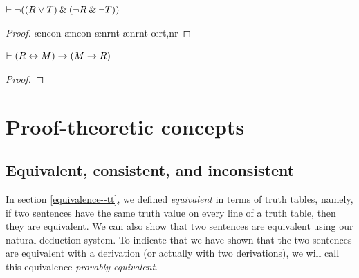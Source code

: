 {{{{{{{{{\begin{small}
\begin{earg}
\noindent\begin{minipage}{0.99\textwidth}
\item $\vdash {\neg}((R \vee T) \mathbin{\&} ({\neg} R  \mathbin{\&} {\neg} T))$
\begin{proof}
\open
         \as{}
         \ae{ncon}
         \ae{ncon}
         \ae{nrnt}
         \ae{nrnt}
         \oe{rt,nr}
\close
{} 
\end{proof}
\medskip
\end{minipage}

\noindent\begin{minipage}{0.99\textwidth}
\item $\vdash (R \leftrightarrow M) \rightarrow (M \rightarrow R)$
\begin{proof}
\open
         \as{}
        	\open
        	 \as{}
        	 
        \close
         
\close
{} 
\end{proof}
\medskip
\end{minipage}

\end{earg}
\end{small}




\chapter{Proof-theoretic concepts}\label{s:ProofTheoreticConcepts}


\section{Equivalent, consistent, and inconsistent}

In section \ref{equivalence--tt}, we defined \textit{equivalent} in terms of truth tables, namely, if two sentences have the same truth value on every line of a truth table, then they are equivalent. We can also show that two sentences are equivalent using our natural deduction system. To indicate that we have shown that the two sentences are equivalent with a derivation (or actually with two derivations), we will call this equivalence \textit{provably equivalent}. 

}}}}}}}}}
